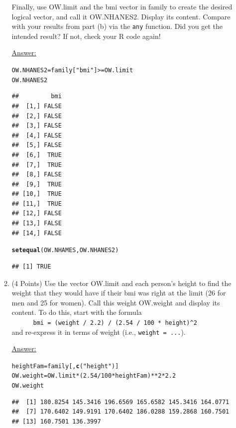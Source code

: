 \documentclass[12pt,letterpaper,final]{article}\usepackage[]{graphicx}\usepackage[]{xcolor}
\makeatletter
\newcommand{\hlnum}[1]{\textcolor[rgb]{0.686,0.059,0.569}{#1}}%
\newcommand{\hlstr}[1]{\textcolor[rgb]{0.192,0.494,0.8}{#1}}%
\newcommand{\hlopt}[1]{\textcolor[rgb]{0,0,0}{#1}}%
\newcommand{\hlstd}[1]{\textcolor[rgb]{0.345,0.345,0.345}{#1}}%
\newcommand{\hlkwb}[1]{\textcolor[rgb]{0.69,0.353,0.396}{#1}}%
\newcommand{\hlkwd}[1]{\textcolor[rgb]{0.737,0.353,0.396}{\textbf{#1}}}%
\newenvironment{kframe}{%
 \def\at@end@of@kframe{}%
 \ifinner\ifhmode%
  \def\at@end@of@kframe{\end{minipage}}%
  \begin{minipage}{\columnwidth}%
 \fi\fi%
 \def\FrameCommand##1{\hskip\@totalleftmargin \hskip-\fboxsep
 \colorbox{shadecolor}{##1}\hskip-\fboxsep
     \hskip-\linewidth \hskip-\@totalleftmargin \hskip\columnwidth}%
 \MakeFramed {\advance\hsize-\width
   \@totalleftmargin\z@ \linewidth\hsize
   \@setminipage}}%
 {\par\unskip\endMakeFramed%
 \at@end@of@kframe}
\newenvironment{knitrout}{}{} %
\makeatother
\begin{document}
\begin{enumerate}
\begin{enumerate}
Finally, use OW.limit and the bmi vector in family to create the desired logical vector, 
and call it OW.NHANES2. Display its content.
Compare with your results from part (b) via the \verb|any| function.
Did you get the intended result? If not, check your R code again!

\underline{Answer:}
\begin{knitrout}
\color{fgcolor}\begin{kframe}
\begin{alltt}
\hlstd{OW.NHANES2} \hlkwb{=} \hlstd{family[}\hlstr{"bmi"}\hlstd{]} \hlopt{>=} \hlstd{OW.limit}
\hlstd{OW.NHANES2}
\end{alltt}
\begin{verbatim}
##         bmi
##  [1,] FALSE
##  [2,] FALSE
##  [3,] FALSE
##  [4,] FALSE
##  [5,] FALSE
##  [6,]  TRUE
##  [7,]  TRUE
##  [8,] FALSE
##  [9,]  TRUE
## [10,]  TRUE
## [11,]  TRUE
## [12,] FALSE
## [13,] FALSE
## [14,] FALSE
\end{verbatim}
\begin{alltt}
\hlkwd{setequal}\hlstd{(OW.NHAMES, OW.NHANES2)}
\end{alltt}
\begin{verbatim}
## [1] TRUE
\end{verbatim}
\end{kframe}
\end{knitrout}


\item (4 Points)
Use the vector OW.limit and each person's height to find the weight 
that they would have if their bmi was right at the limit (26 for men and 
25 for women). Call this weight OW.weight and display its content.
To do this, start with the formula \\
\verb|      bmi = (weight / 2.2) / (2.54 / 100 * height)^2| \\
and re-express it in terms of weight (i.e., \verb|weight = ...|).

\underline{Answer:}
\begin{knitrout}
\color{fgcolor}\begin{kframe}
\begin{alltt}
\hlstd{heightFam} \hlkwb{=} \hlstd{family[,}\hlkwd{c}\hlstd{(}\hlstr{"height"}\hlstd{)]}
\hlstd{OW.weight} \hlkwb{=} \hlstd{OW.limit}\hlopt{*}\hlstd{(}\hlnum{2.54}\hlopt{/}\hlnum{100}\hlopt{*}\hlstd{heightFam)}\hlopt{**}\hlnum{2}\hlopt{*}\hlnum{2.2}
\hlstd{OW.weight}
\end{alltt}
\begin{verbatim}
##  [1] 180.8254 145.3416 196.6569 165.6582 145.3416 164.0771
##  [7] 170.6402 149.9191 170.6402 186.0288 159.2868 160.7501
## [13] 160.7501 136.3997
\end{verbatim}
\end{kframe}
\end{knitrout}



\end{enumerate}
\end{enumerate}
\end{document}
